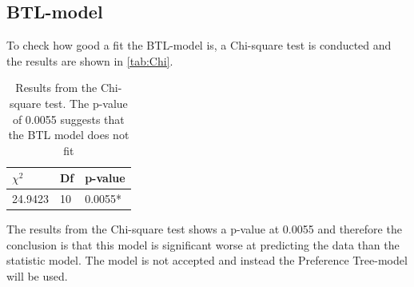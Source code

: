 \subsection*{BTL-model}
To check how good a fit the BTL-model is, a Chi-square test is conducted and the results are shown in \autoref{tab:Chi}. 
%
\begin{table}[H]
\centering
\begin{tabular}{@{}lll@{}}
\toprule
$\chi^{2}$   & Df  & p-value \\ \midrule
24.9423      & 10  & 0.0055* \\ \bottomrule
\end{tabular}
\caption{Results from the Chi-square test. The p-value of 0.0055 suggests that the BTL model does not fit}
\label{tab:Chi}
\end{table} 
\noindent 
The results from the Chi-square test shows a p-value at 0.0055 and therefore the conclusion is that this model is significant worse at predicting the data than the statistic model. The model is not accepted and instead the Preference Tree-model will be used. 

